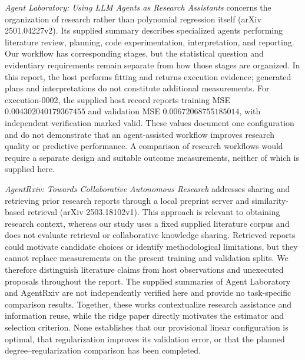 \documentclass[11pt]{article}
\begin{document}
\emph{Agent Laboratory: Using LLM Agents as Research Assistants} concerns the organization of research rather than polynomial regression itself (arXiv 2501.04227v2). Its supplied summary describes specialized agents performing literature review, planning, code experimentation, interpretation, and reporting. Our workflow has corresponding stages, but the statistical question and evidentiary requirements remain separate from how those stages are organized. In this report, the host performs fitting and returns execution evidence; generated plans and interpretations do not constitute additional measurements. For execution-0002, the supplied host record reports training MSE \(0.004302040179367455\) and validation MSE \(0.00672068755185014\), with independent verification marked valid. These values document one configuration and do not demonstrate that an agent-assisted workflow improves research quality or predictive performance. A comparison of research workflows would require a separate design and suitable outcome measurements, neither of which is supplied here.

\emph{AgentRxiv: Towards Collaborative Autonomous Research} addresses sharing and retrieving prior research reports through a local preprint server and similarity-based retrieval (arXiv 2503.18102v1). This approach is relevant to obtaining research context, whereas our study uses a fixed supplied literature corpus and does not evaluate retrieval or collaborative knowledge sharing. Retrieved reports could motivate candidate choices or identify methodological limitations, but they cannot replace measurements on the present training and validation splits. We therefore distinguish literature claims from host observations and unexecuted proposals throughout the report. The supplied summaries of Agent Laboratory and AgentRxiv are not independently verified here and provide no task-specific comparison results. Together, these works contextualize research assistance and information reuse, while the ridge paper directly motivates the estimator and selection criterion. None establishes that our provisional linear configuration is optimal, that regularization improves its validation error, or that the planned degree--regularization comparison has been completed.
\end{document}
